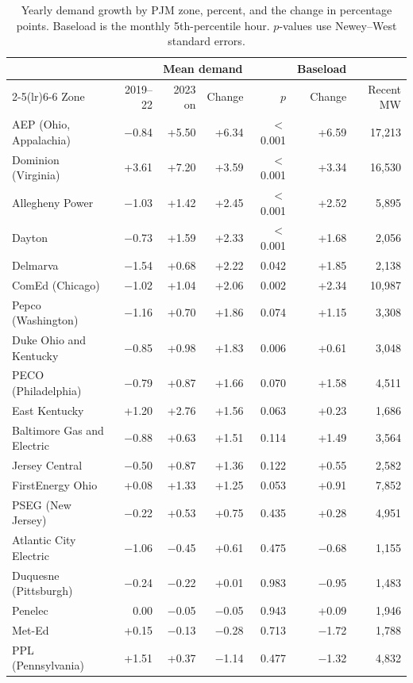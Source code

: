 \documentclass[11pt,a4paper]{article}
\begin{document}
\begin{table}[H]
\centering\footnotesize
\caption{Yearly demand growth by PJM zone, percent, and the change in percentage points. Baseload is the monthly 5th-percentile hour. $p$-values use Newey--West standard errors.}\label{tab:zones}
\begin{tabular}{lrrrrrr}
\toprule
 & \multicolumn{4}{c}{Mean demand} & Baseload & \\ \cmidrule(lr){2-5}\cmidrule(lr){6-6}
Zone & 2019--22 & 2023 on & Change & $p$ & Change & Recent MW \\
\midrule
AEP (Ohio, Appalachia) & $-$0.84 & +5.50 & +6.34 & $<$0.001 & +6.59 & 17,213 \\
Dominion (Virginia) & +3.61 & +7.20 & +3.59 & $<$0.001 & +3.34 & 16,530 \\
Allegheny Power & $-$1.03 & +1.42 & +2.45 & $<$0.001 & +2.52 & 5,895 \\
Dayton & $-$0.73 & +1.59 & +2.33 & $<$0.001 & +1.68 & 2,056 \\
Delmarva & $-$1.54 & +0.68 & +2.22 & 0.042 & +1.85 & 2,138 \\
ComEd (Chicago) & $-$1.02 & +1.04 & +2.06 & 0.002 & +2.34 & 10,987 \\
Pepco (Washington) & $-$1.16 & +0.70 & +1.86 & 0.074 & +1.15 & 3,308 \\
Duke Ohio and Kentucky & $-$0.85 & +0.98 & +1.83 & 0.006 & +0.61 & 3,048 \\
PECO (Philadelphia) & $-$0.79 & +0.87 & +1.66 & 0.070 & +1.58 & 4,511 \\
East Kentucky & +1.20 & +2.76 & +1.56 & 0.063 & +0.23 & 1,686 \\
Baltimore Gas and Electric & $-$0.88 & +0.63 & +1.51 & 0.114 & +1.49 & 3,564 \\
Jersey Central & $-$0.50 & +0.87 & +1.36 & 0.122 & +0.55 & 2,582 \\
FirstEnergy Ohio & +0.08 & +1.33 & +1.25 & 0.053 & +0.91 & 7,852 \\
PSEG (New Jersey) & $-$0.22 & +0.53 & +0.75 & 0.435 & +0.28 & 4,951 \\
Atlantic City Electric & $-$1.06 & $-$0.45 & +0.61 & 0.475 & $-$0.68 & 1,155 \\
Duquesne (Pittsburgh) & $-$0.24 & $-$0.22 & +0.01 & 0.983 & $-$0.95 & 1,483 \\
Penelec & 0.00 & $-$0.05 & $-$0.05 & 0.943 & +0.09 & 1,946 \\
Met-Ed & +0.15 & $-$0.13 & $-$0.28 & 0.713 & $-$1.72 & 1,788 \\
PPL (Pennsylvania) & +1.51 & +0.37 & $-$1.14 & 0.477 & $-$1.32 & 4,832 \\
\bottomrule
\end{tabular}
\end{table}
\end{document}
